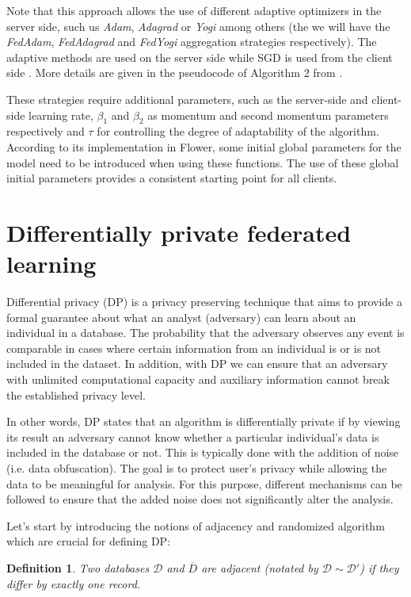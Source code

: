 \documentclass[5p,times]{elsarticle}
\newtheorem{definition}{Definition}
\begin{document}
Note that this approach allows the use of different adaptive optimizers in the server side, such us \textit{Adam}, \textit{Adagrad} or \textit{Yogi} among others (the we will have the \textit{FedAdam}, \textit{FedAdagrad} and \textit{FedYogi} aggregation strategies respectively). The adaptive methods are used on the server side while SGD is used from the client side \cite{reddi2020adaptive}. More details are given in the pseudocode of Algorithm 2 from \cite{reddi2020adaptive}.

These strategies require additional parameters, such as the server-side and client-side learning rate, $\beta_{1}$ and $\beta_{2}$ as momentum and second momentum parameters respectively and $\tau$ for controlling the degree of adaptability of the algorithm. According to its implementation in Flower, some initial global parameters for the model need to be introduced when using these functions. The use of these global initial parameters provides a consistent starting point for all clients.

\section{Differentially private federated learning}\label{sec:dp_fl}

Differential privacy (DP) is a privacy preserving technique that aims to provide a formal guarantee about what an analyst (adversary) can learn about an individual in a database. The probability that the adversary observes  any event is comparable in cases where certain information from an individual is or is not included in the dataset.  In addition, with DP we can ensure that an adversary with unlimited computational capacity and auxiliary information cannot break the established privacy level.

In other words, DP states that an algorithm is differentially private if by viewing its result an adversary cannot know whether a particular individual's data is included in the database or not. 
This is typically done with the addition of noise (i.e. data obfuscation).
The goal is to protect user's privacy while allowing the data to be meaningful for analysis. For this purpose, different mechanisms can be followed to ensure that the added noise does not significantly alter the analysis.

Let's start by introducing the notions of adjacency and randomized algorithm which are crucial for defining DP:

\begin{definition}
    Two databases $\mathcal{D}$ and $\overline{D}$ are adjacent (notated by $\mathcal{D} \sim \mathcal{D'}$) if they differ by exactly one record.
\end{definition}
\end{document}

